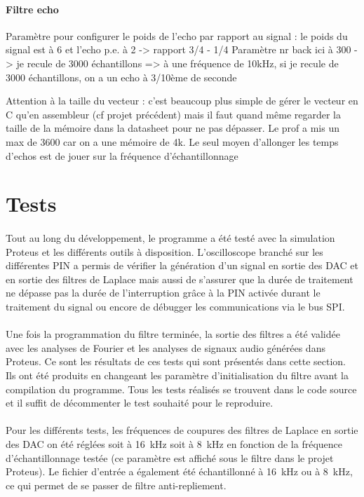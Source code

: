\documentclass{article}
\begin{document}
    \paragraph{Filtre echo}
    Paramètre pour configurer le poids de l'echo par rapport au signal : le poids du signal est à 6 et l'echo p.e. à 2 -> rapport 3/4 - 1/4
    Paramètre nr back ici à 300 -> je recule de 3000 échantillons => à une fréquence de 10kHz, si je recule de 3000 échantillons, on a un echo à 3/10ème de seconde

    Attention à la taille du vecteur : c'est beaucoup plus simple de gérer le vecteur en C qu'en assembleur (cf projet précédent) mais il faut quand même regarder la taille de la mémoire dans la datasheet pour ne pas dépasser. Le prof a mis un max de 3600 car on a une mémoire de 4k. Le seul moyen d'allonger les temps d'echos est de jouer sur la fréquence d'échantillonnage


    \newpage
    \section{Tests}

    \paragraph{}
    Tout au long du développement, le programme a été testé avec la simulation Proteus et les différents outils à disposition. L'oscilloscope branché sur les différentes PIN a permis de vérifier la génération d'un signal en sortie des DAC et en sortie des filtres de Laplace mais aussi de s'assurer que la durée de traitement ne dépasse pas la durée de l'interruption grâce à la PIN activée durant le traitement du signal ou encore de débugger les communications via le bus SPI.

    \paragraph{}
    Une fois la programmation du filtre terminée, la sortie des filtres a été validée avec les analyses de Fourier et les analyses de signaux audio générées dans Proteus. Ce sont les résultats de ces tests qui sont présentés dans cette section. Ils ont été produits en changeant les paramètre d'initialisation du filtre avant la compilation du programme. Tous les tests réalisés se trouvent dans le code source et il suffit de décommenter le test souhaité pour le reproduire.

    \paragraph{}
    Pour les différents tests, les fréquences de coupures des filtres de Laplace en sortie des DAC on été réglées soit à \SI{16}{\kilo\hertz} soit à \SI{8}{\kilo\hertz} en fonction de la fréquence d'échantillonnage testée (ce paramètre est affiché sous le filtre dans le projet Proteus). Le fichier d'entrée a également été échantillonné à \SI{16}{\kilo\hertz} ou à \SI{8}{\kilo\hertz}, ce qui permet de se passer de filtre anti-repliement.
\end{document}
